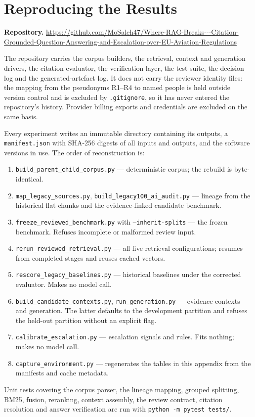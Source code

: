 \section{Reproducing the Results}

\noindent\textbf{Repository.} \url{https://github.com/MoSaleh47/Where-RAG-Breaks---Citation-Grounded-Question-Answering-and-Escalation-over-EU-Aviation-Regulations}

\noindent The repository carries the corpus builders, the retrieval, context and generation drivers, the citation evaluator, the verification layer, the test suite, the decision log and the generated-artefact log. It does not carry the reviewer identity files: the mapping from the pseudonyms R1--R4 to named people is held outside version control and is excluded by \texttt{.gitignore}, so it has never entered the repository's history. Provider billing exports and credentials are excluded on the same basis.

Every experiment writes an immutable directory containing its outputs, a
\texttt{manifest.json} with SHA-256 digests of all inputs and outputs, and the
software versions in use. The order of reconstruction is:

\begin{enumerate}
  \item \texttt{build\_parent\_child\_corpus.py} --- deterministic corpus; the
    rebuild is byte-identical.
  \item \texttt{map\_legacy\_sources.py}, \texttt{build\_legacy100\_ai\_audit.py}
    --- lineage from the historical flat chunks and the evidence-linked
    candidate benchmark.
  \item \texttt{freeze\_reviewed\_benchmark.py} with \texttt{--inherit-splits}
    --- the frozen benchmark. Refuses incomplete or malformed review input.
  \item \texttt{rerun\_reviewed\_retrieval.py} --- all five retrieval
    configurations; resumes from completed stages and reuses cached vectors.
  \item \texttt{rescore\_legacy\_baselines.py} --- historical baselines under the
    corrected evaluator. Makes no model call.
  \item \texttt{build\_candidate\_contexts.py}, \texttt{run\_generation.py} ---
    evidence contexts and generation. The latter defaults to the development
    partition and refuses the held-out partition without an explicit flag.
  \item \texttt{calibrate\_escalation.py} --- escalation signals and rules.
    Fits nothing; makes no model call.
  \item \texttt{capture\_environment.py} --- regenerates the tables in this
    appendix from the manifests and cache metadata.
\end{enumerate}

Unit tests covering the corpus parser, the lineage mapping, grouped splitting,
BM25, fusion, reranking, context assembly, the review contract, citation
resolution and answer verification are run with \texttt{python -m pytest tests/}.
